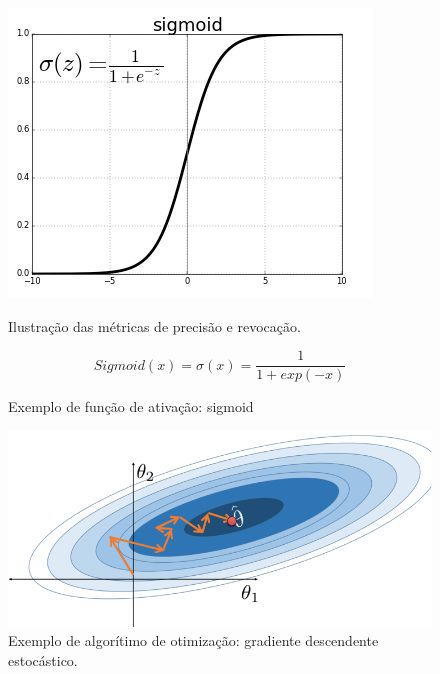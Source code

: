 \begin{figure}[!ht]
    \centering
    \begin{minipage}[c]{0.4\textwidth}
        \includegraphics[width=\columnwidth]{Imagens/sigmoid-activation-function.jpg}
        \caption{Ilustração das métricas de precisão e revocação.}
    \end{minipage}%
    \begin{minipage}{0.5\textwidth}
        \begin{equation} Sigmoid(x) = \sigma(x) = \frac{1} {1+ exp(-x)}\end{equation}
        \caption{Exemplo de função de ativação: sigmoid}     
    \end{minipage}       
    \label{fig:sigmoid}
\end{figure}


\begin{figure}[!ht]
    \centering
        \includegraphics[width=0.47\columnwidth]{Imagens/stochastic_gradient_descent.PNG}
    \caption{Exemplo de algorítimo de otimização: gradiente descendente estocástico. }
    \label{fig:SGD}
\end{figure}






